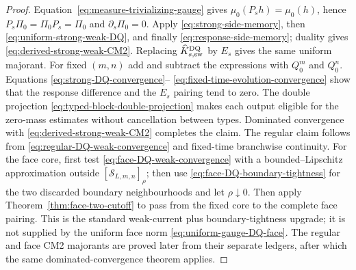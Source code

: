 \documentclass[11pt]{article}
\begin{document}
\begin{proof}
Equation~\eqref{eq:measure-trivializing-gauge} gives
$\mu_0(P_sh)=\mu_0(h)$, hence $P_s\Pi_0=\Pi_0P_s=\Pi_0$ and
$\partial_s\Pi_0=0$.  Apply \eqref{eq:strong-side-memory}, then
\eqref{eq:uniform-strong-weak-DQ}, and finally
\eqref{eq:response-side-memory}; duality gives
\eqref{eq:derived-strong-weak-CM2}.  Replacing
$\widehat K_{s,\rm sw}^{\rm DQ}$ by $E_s$ gives the same uniform majorant.
For fixed $(m,n)$ add and subtract the expressions with $Q_0^m$ and $Q_0^n$.
Equations \eqref{eq:strong-DQ-convergence}--
\eqref{eq:fixed-time-evolution-convergence} show that the response difference
and the $E_s$ pairing tend to zero.  The double projection
\eqref{eq:typed-block-double-projection} makes each output eligible for the
zero-mass estimates without cancellation between types.  Dominated
convergence with \eqref{eq:derived-strong-weak-CM2} completes the claim.  The
regular claim follows from
\eqref{eq:regular-DQ-weak-convergence} and fixed-time branchwise continuity.
For the face core, first test
\eqref{eq:face-DQ-weak-convergence} with a bounded--Lipschitz approximation
outside $[\mathcal S_{L,m,n}]_\rho$; then use
\eqref{eq:face-DQ-boundary-tightness} for the two discarded boundary
neighbourhoods and let $\rho\downarrow0$.  Then apply
Theorem~\ref{thm:face-two-cutoff} to pass from the fixed core to the complete
face pairing.  This is the standard
weak-current plus boundary-tightness upgrade; it is not supplied by the
uniform face norm \eqref{eq:uniform-gauge-DQ-face}.  The regular and face
CM2 majorants are proved later from their separate ledgers, after which the
same dominated-convergence theorem applies.
\end{proof}
\end{document}
